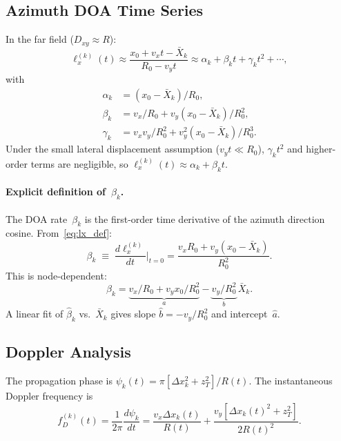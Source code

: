\documentclass[11pt,a4paper]{article}
\begin{document}
\subsection{Azimuth DOA Time Series}
\label{sec:doa_time}

In the far field ($D_{xy}\approx R$):
\begin{equation}
  \ell_x^{(k)}(t)\approx
  \frac{x_0+v_x t-\bar{X}_k}{R_0-v_y t}
  \approx\alpha_k+\beta_k t+\gamma_k t^2+\cdots,
  \label{eq:lx_taylor}
\end{equation}
with
\begin{align}
  \alpha_k &= (x_0{-}\bar{X}_k)/R_0,
  \label{eq:alpha}\\
  \beta_k &= v_x/R_0 + v_y(x_0{-}\bar{X}_k)/R_0^2,
  \label{eq:beta_k}\\
  \gamma_k &= v_xv_y/R_0^2 + v_y^2(x_0{-}\bar{X}_k)/R_0^3.
  \label{eq:gamma}
\end{align}
Under the small lateral displacement assumption ($v_y t\ll R_0$),
$\gamma_k t^2$ and higher-order terms are negligible, so
$\ell_x^{(k)}(t)\approx\alpha_k+\beta_k t$.

\paragraph{Explicit definition of~$\beta_k$.}
The DOA rate~$\beta_k$ is the first-order time derivative of the
azimuth direction cosine.  From~\eqref{eq:lx_def}:
\begin{equation}
  \beta_k \;\equiv\; \frac{d\ell_x^{(k)}}{dt}\bigg|_{t=0}
  = \frac{v_x R_0 + v_y(x_0-\bar{X}_k)}{R_0^2}.
  \label{eq:beta_def}
\end{equation}
This is node-dependent:
\begin{equation}
  \beta_k = \underbrace{v_x/R_0+v_yx_0/R_0^2}_{a}
  -\underbrace{v_y/R_0^2}_{b}\,\bar{X}_k.
  \label{eq:beta_linear}
\end{equation}
A linear fit of $\hat{\beta}_k$ vs.\ $\bar{X}_k$ gives slope
$\hat{b}=-v_y/R_0^2$ and intercept~$\hat{a}$.

\subsection{Doppler Analysis}
\label{sec:doppler}

The propagation phase is
$\psi_k(t)=\pi[\Delta x_k^2+z_T^2]/R(t)$.  The instantaneous
Doppler frequency is
\begin{equation}
  f_D^{(k)}(t)=\frac{1}{2\pi}\frac{d\psi_k}{dt}
  =\frac{v_x\Delta x_k(t)}{R(t)}
  +\frac{v_y[\Delta x_k(t)^2+z_T^2]}{2R(t)^2}.
  \label{eq:doppler}
\end{equation}
\end{document}
